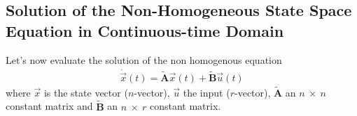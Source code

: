 \documentclass[11pt,a4paper,oneside]{book}
\numberwithin{equation}{section}
\theoremstyle{it}
\theoremstyle{definition}
\begin{document}
\subsection{Solution of the Non-Homogeneous State Space Equation in 
Continuous-time Domain}
Let's now evaluate the solution of the non homogenous equation 
\begin{equation}\label{ss_solution_eq12}
	\begin{aligned}
		\dot{\vec{x}}(t)=\tilde{\mathbf{A}}\vec{x}(t) + \tilde{\mathbf{B}}\vec{u}(t)
	\end{aligned}
\end{equation}
where $\vec{x}$ is the state vector ($n$-vector), $\vec{u}$ the input ($r$-vector), $\tilde{\mathbf{A}}$ an $n \ \times \ n$ constant matrix and $\tilde{\mathbf{B}}$ an $n \ \times \ r$ constant matrix.
\end{document}
